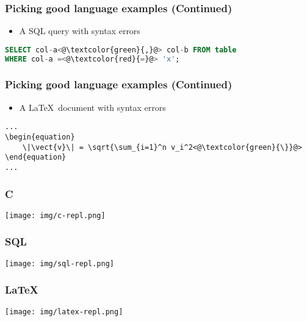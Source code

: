 \documentclass[t,24pt,aspectratio=169]{beamer}
\begin{document}
\begin{frame}[fragile]
    \frametitle{Picking good language examples (Continued)}

    \begin{multicols}{2}
        \begin{itemize}
            \item A SQL query with syntax errors

        \end{itemize}

        \columnbreak

        \begin{lstlisting}[language=sql]
SELECT col-a<@\textcolor{green}{,}@> col-b FROM table
WHERE col-a =<@\textcolor{red}{=}@> 'x';
        \end{lstlisting}
    \end{multicols}
\end{frame}

\begin{frame}[fragile]
    \frametitle{Picking good language examples (Continued)}

    \begin{multicols*}{2}
        \begin{itemize}
            \item A \LaTeX \ document with syntax errors
        \end{itemize}

        \columnbreak

        \begin{lstlisting}[basicstyle=\tiny\ttfamily]
...
\begin{equation}
    \|\vect{v}\| = \sqrt{\sum_{i=1}^n v_i^2<@\textcolor{green}{\}}@>
\end{equation}
...
        \end{lstlisting}
    \end{multicols*}
\end{frame}

\begin{frame}[hvid]
    \frametitle{C}
    \texttt{[image: img/c-repl.png]}
\end{frame}

\begin{frame}[hvid]
    \frametitle{SQL}
    \texttt{[image: img/sql-repl.png]}
\end{frame}

\begin{frame}[hvid]
    \frametitle{\LaTeX}
    \texttt{[image: img/latex-repl.png]}
\end{frame}
\end{document}
